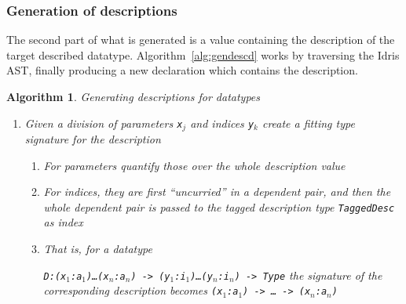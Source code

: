 \documentclass{ituthesis}
\newcommand{\tttype}[1]{\textcolor{type-color}{\texttt{#1}}}
\newcommand{\ttdec}[1]{\textcolor{declared-var-color}{\texttt{#1}}}
\newcommand{\ttvar}[1]{\textcolor{local-var-color}{\texttt{#1}}}
\theoremstyle{break}
\newtheorem{alg}{Algorithm}
\begin{document}
\subsubsection{Generation of descriptions}
\label{ssub:Generation of descriptions}
The second part of what is generated is a value containing the description of the target described datatype.
Algorithm~\ref{alg:gendescd} works by traversing the Idris AST, finally producing a new declaration which contains the description.

\begin{alg}
  Generating descriptions for datatypes
  \begin{enumerate}
    \item Given a division of parameters \ttvar{x$_j$} and indices \ttvar{y$_k$} create a fitting type signature for the description
       \begin{enumerate}
         \item For parameters quantify those over the whole description value
         \item For indices, they are first ``uncurried'' in a dependent pair, and then the whole dependent pair is passed to the tagged description type \ttdec{TaggedDesc} as index
         \item[] That is, for a datatype
           
           \tttype{D}\texttt{:}\texttt{(}\ttvar{x$_1$}\texttt{:}\ttvar{a$_1$}\texttt{)}\texttt{\ldots}\texttt{(}\ttvar{x$_n$}\texttt{:}\ttvar{a$_n$}\texttt{)}\texttt{~->~}\texttt{(}\ttvar{y$_1$}\texttt{:}\ttvar{i$_1$}\texttt{)}\texttt{\ldots}\texttt{(}\ttvar{y$_n$}\texttt{:}\ttvar{i$_n$}\texttt{)}\texttt{~->~}\tttype{Type} the signature of the corresponding description becomes \texttt{(}\ttvar{x$_1$}\texttt{:}\ttvar{a$_1$}\texttt{)}\texttt{~->~}\texttt{\ldots}\texttt{~->~}\texttt{(}\ttvar{x$_n$}\texttt{:}\ttvar{a$_n$}\texttt{)}
           

\end{enumerate}
\end{enumerate}
\end{alg}
\end{document}
